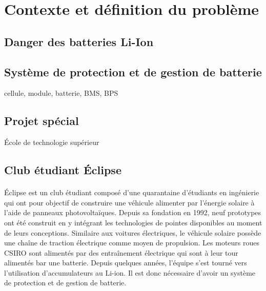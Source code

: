 \documentclass[12pt,letterpaper]{article}
\begin{document}
\section{Contexte et définition du problème}


\subsection{Danger des batteries Li-Ion}

\subsection{Système de protection et de gestion de batterie}

cellule, module, batterie, BMS, BPS

\subsection{Projet spécial}

École de technologie supérieur

\subsection{Club étudiant Éclipse}

\paragraph{}
Éclipse est un club étudiant composé d'une quarantaine d'étudiants en ingénierie qui ont pour objectif de construire une véhicule alimenter par l'énergie solaire à l'aide de panneaux photovoltaïques. Depuis sa fondation en 1992, neuf prototypes ont été construit en y intégrant les technologies de pointes disponibles au moment de leurs conceptions. Similaire aux voitures électriques, le véhicule solaire possède une chaîne de traction électrique comme moyen de propulsion. Les moteurs roues  CSIRO sont alimentés par des entraînement électrique qui sont à leur tour alimentés bar une batterie. Depuis quelques années, l'équipe s'est tourné vers l'utilisation d'accumulateurs au Li-ion. Il est donc nécessaire d'avoir un système de protection et de gestion de batterie.
\end{document}
